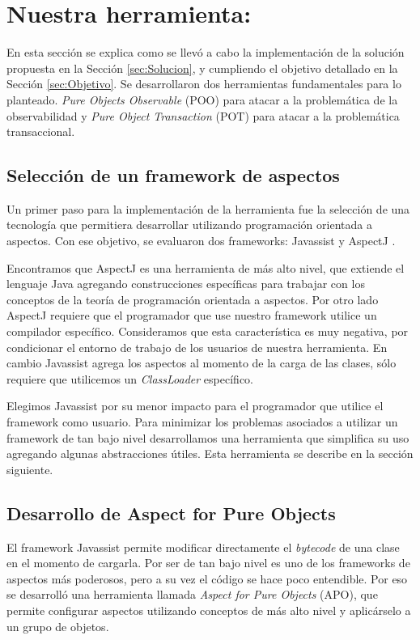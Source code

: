 \section{Nuestra herramienta: }

	En esta sección se explica como se llevó a cabo la implementación de la solución
	propuesta en la Sección \ref{sec:Solucion}, y cumpliendo el objetivo detallado
	en la Sección \ref{sec:Objetivo}. Se desarrollaron dos herramientas
	fundamentales para lo planteado. \emph{Pure Objects Observable} (POO) para atacar a la
	problemática de la observabilidad y \emph{Pure Object Transaction} (POT) para
	atacar a la problemática transaccional.
		
	\subsection{Selección de un framework de aspectos}  
		Un primer paso para la implementación de la herramienta fue la selección de una
		tecnología que permitiera desarrollar utilizando programación orientada a
		aspectos.
		Con ese objetivo, se evaluaron dos frameworks: Javassist \cite{??} y AspectJ
		\cite{KiczalesHHKPG01}.
		
		\medskip 
		Encontramos que AspectJ es una herramienta de más alto nivel, que extiende
		el lenguaje Java agregando construcciones específicas para trabajar con
		los conceptos de la teoría de programación orientada a aspectos.
		Por otro lado AspectJ requiere que el programador que use nuestro framework
		utilice un compilador específico. Consideramos que esta característica es muy
		negativa, por condicionar el entorno de trabajo de los usuarios de nuestra
		herramienta.
		En cambio Javassist agrega los aspectos al momento de la carga de las clases,
		sólo requiere que utilicemos un \emph{ClassLoader} específico.
		
		Elegimos Javassist por su menor impacto para el programador que utilice el
		framework como usuario.
		Para minimizar los problemas asociados a utilizar un framework de tan bajo
		nivel desarrollamos una herramienta que simplifica su uso agregando algunas
		abstracciones útiles. Esta herramienta se describe en la sección siguiente.

	\subsection{Desarrollo de Aspect for Pure Objects}

		El framework Javassist permite modificar directamente el \emph{bytecode} de
		una clase en el momento de cargarla.
		Por ser de tan bajo nivel es uno de los frameworks de aspectos más poderosos,
		pero a su vez el código se hace poco entendible.
		Por eso se desarrolló una herramienta llamada \emph{Aspect for Pure Objects} (APO), 
		que permite configurar aspectos utilizando conceptos de más alto nivel y
		aplicárselo a un grupo de objetos.
		
